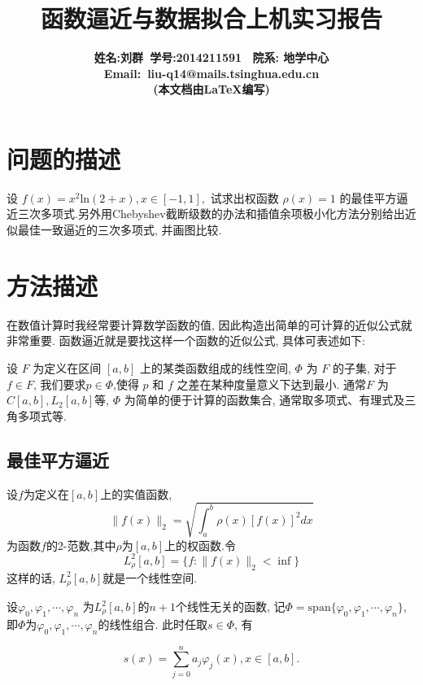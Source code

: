 \documentclass[a4paper]{article}
\begin{document}
\begin{spacing}{1.5}
\begin{CJK*}{GBK}{song}
\title{\bf{函数逼近与数据拟合上机实习报告}}
\author{\bf{姓名:刘群\ 学号:2014211591 \ 院系: 地学中心}\\ \bf{Email}:\ liu-q14@mails.tsinghua.edu.cn \\ (本文档由\LaTeX{}编写)}
\date{}
\maketitle


\section{问题的描述}
设 $f(x)=x^2\text{ln}(2+x), x\in [-1, 1],$ 试求出权函数 $\rho(x)=1$ 的最佳平方逼近三次多项式.另外用Chebyshev截断级数的办法和插值余项极小化方法分别给出近似最佳一致逼近的三次多项式, 并画图比较.

\section{方法描述}
在数值计算时我经常要计算数学函数的值, 因此构造出简单的可计算的近似公式就非常重要. 函数逼近就是要找这样一个函数的近似公式, 具体可表述如下:\par
设 $F$ 为定义在区间 $[a,b]$ 上的某类函数组成的线性空间, $\Phi$ 为 $F$ 的子集, 对于$f\in F$, 我们要求$p\in \Phi$,使得 $p$ 和 $f$ 之差在某种度量意义下达到最小. 通常$F$ 为$C[a,b], L_2[a,b]$等, $\Phi$ 为简单的便于计算的函数集合, 通常取多项式、有理式及三角多项式等.

\subsection{最佳平方逼近}
设$f$为定义在$[a,b]$上的实值函数,
$$\parallel f(x)\parallel _2 = \sqrt{\int_a^b\rho(x)[f(x)]^2dx}$$
为函数$f$的2-范数,其中$\rho$为$[a,b]$上的权函数.令
$$L_{\rho}^2[a,b]=\{f:\parallel f(x)\parallel _2<\inf\}$$
这样的话, $L_{\rho}^2[a,b]$就是一个线性空间. \par
设$\varphi_0, \varphi_1, \cdots,\varphi_n$ 为$L_{\rho}^2[a,b]$的$n+1$个线性无关的函数, 记$\Phi=\text{span}\{\varphi_0, \varphi_1, \cdots,\varphi_n\}$, 即$\Phi$为$\varphi_0, \varphi_1, \cdots,\varphi_n$的线性组合. 此时任取$s\in \Phi$, 有

\begin{equation}
s(x)= \sum_{j=0}^na_j\varphi_j(x), x \in [a, b].
\end{equation}


\end{CJK*}
\end{spacing}
\end{document}
